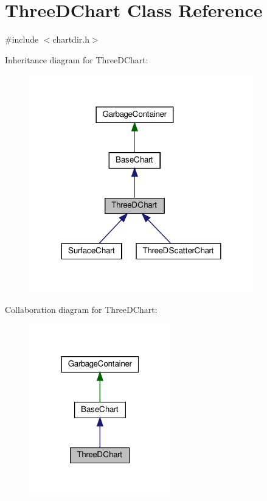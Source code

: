 \hypertarget{class_three_d_chart}{}\section{Three\+D\+Chart Class Reference}
\label{class_three_d_chart}


{\ttfamily \#include $<$chartdir.\+h$>$}



Inheritance diagram for Three\+D\+Chart\+:
\nopagebreak
\begin{figure}[H]
\begin{center}
\leavevmode
\includegraphics[width=276pt]{class_three_d_chart__inherit__graph}
\end{center}
\end{figure}


Collaboration diagram for Three\+D\+Chart\+:
\nopagebreak
\begin{figure}[H]
\begin{center}
\leavevmode
\includegraphics[width=175pt]{class_three_d_chart__coll__graph}
\end{center}
\end{figure}
